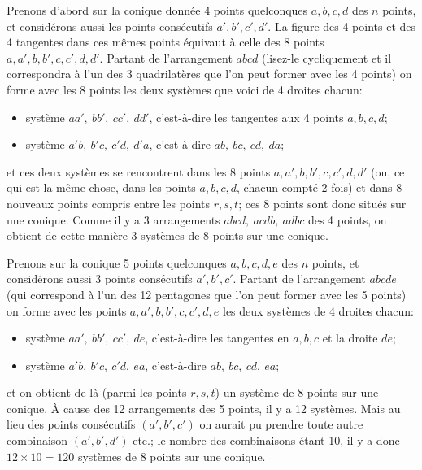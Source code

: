 \documentclass[11pt]{article}
\begin{document}
Prenons d'abord sur la conique donn\'ee 4 points quelconques $a, b, c, d$ des $n$ points, et consid\'erons aussi les points cons\'ecutifs $a', b', c', d'$. La figure des 4 points et des 4 tangentes dans ces m\^emes points \'equivaut \`a celle des 8 points $a, a', b, b', c, c', d, d'$. Partant de l'arrangement $abcd$ (lisez-le cycliquement et il correspondra \`a l'un des 3 quadrilat\`eres que l'on peut former avec les 4 points) on forme avec les 8 points les deux syst\`emes que voici de 4 droites chacun:
\begin{itemize}
\item syst\`eme $aa',\ bb',\ cc',\ dd'$, c'est-\`a-dire les tangentes aux 4 points $a, b, c, d$;
\item syst\`eme $a'b,\ b'c,\ c'd,\ d'a$, c'est-\`a-dire $ab,\ bc,\ cd,\ da$;
\end{itemize}
et ces deux syst\`emes se rencontrent dans les 8 points $a, a', b, b', c, c', d, d'$ (ou, ce qui est la m\^eme chose, dans les points $a, b, c, d$, chacun compt\'e 2 fois) et dans 8 nouveaux points compris entre les points $r, s, t$; ces 8 points sont donc situ\'es sur une conique. Comme il y a 3 arrangements $abcd,\ acdb,\ adbc$ des 4 points, on obtient de cette mani\`ere 3 syst\`emes de 8 points sur une conique.

Prenons sur la conique 5 points quelconques $a, b, c, d, e$ des $n$ points, et consid\'erons aussi 3 points cons\'ecutifs $a', b', c'$. Partant de l'arrangement $abcde$ (qui correspond \`a l'un des 12 pentagones que l'on peut former avec les 5 points) on forme avec les points $a, a', b, b', c, c', d, e$ les deux syst\`emes de 4 droites chacun:
\begin{itemize}
\item syst\`eme $aa',\ bb',\ cc',\ de$, c'est-\`a-dire les tangentes en $a, b, c$ et la droite $de$;
\item syst\`eme $a'b,\ b'c,\ c'd,\ ea$, c'est-\`a-dire $ab,\ bc,\ cd,\ ea$;
\end{itemize}
et on obtient de l\`a (parmi les points $r, s, t$) un syst\`eme de 8 points sur une conique. \`A cause des 12 arrangements des 5 points, il y a 12 syst\`emes. Mais au lieu des points cons\'ecutifs $(a', b', c')$ on aurait pu prendre toute autre combinaison $(a', b', d')$ etc.; le nombre des combinaisons \'etant 10, il y a donc $12 \times 10 = 120$ syst\`emes de 8 points sur une conique.
\end{document}
